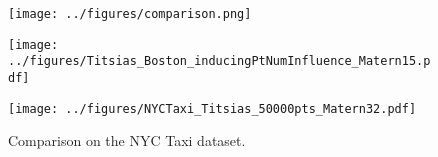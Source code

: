 \documentclass{beamer}
\begin{document}
\begin{frame}
	\begin{figure}
	\texttt{[image: ../figures/comparison.png]}
	\end{figure}

	\begin{figure}
		\texttt{[image: ../figures/Titsias\_Boston\_inducingPtNumInfluence\_Matern15.pdf]}
	\end{figure}
    
\end{frame}


\begin{frame}	
	\begin{figure}
		\texttt{[image: ../figures/NYCTaxi\_Titsias\_50000pts\_Matern32.pdf]}
		\caption{Comparison on the NYC Taxi dataset.}
	\end{figure}
	
\end{frame}
\end{document}

